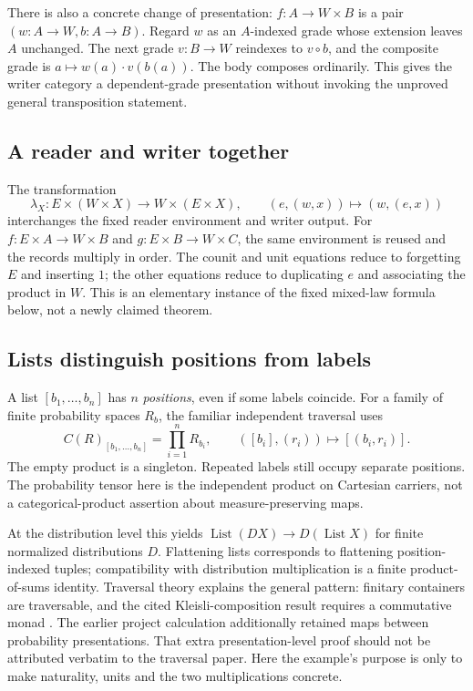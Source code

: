 \documentclass[11pt,letterpaper]{article}
\newcommand{\List}{\operatorname{List}}
\newcommand{\comp}{\mathbin{\circ}}
\begin{document}
There is also a concrete change of presentation: $f:A\to W\times B$ is a pair $(w:A\to W,b:A\to B)$. Regard $w$ as an $A$-indexed grade whose extension leaves $A$ unchanged. The next grade $v:B\to W$ reindexes to $v\comp b$, and the composite grade is $a\mapsto w(a)\cdot v(b(a))$. The body composes ordinarily. This gives the writer category a dependent-grade presentation without invoking the unproved general transposition statement.

\subsection{A reader and writer together}
The transformation
\[
\lambda_X:E\times(W\times X)\longrightarrow W\times(E\times X),
\qquad(e,(w,x))\longmapsto(w,(e,x))
\]
interchanges the fixed reader environment and writer output. For $f:E\times A\to W\times B$ and $g:E\times B\to W\times C$, the same environment is reused and the records multiply in order. The counit and unit equations reduce to forgetting $E$ and inserting $1$; the other equations reduce to duplicating $e$ and associating the product in $W$. This is an elementary instance of the fixed mixed-law formula below, not a newly claimed theorem.

\subsection{Lists distinguish positions from labels}
A list $[b_1,\ldots,b_n]$ has $n$ \emph{positions}, even if some labels coincide. For a family of finite probability spaces $R_b$, the familiar independent traversal uses
\[
C(R)_{[b_1,\ldots,b_n]}=\prod_{i=1}^{n}R_{b_i},
\qquad
([b_i],(r_i))\longmapsto[(b_i,r_i)].
\]
The empty product is a singleton. Repeated labels still occupy separate positions. The probability tensor here is the independent product on Cartesian carriers, not a categorical-product assertion about measure-preserving maps.

At the distribution level this yields $\List(DX)\to D(\List X)$ for finite normalized distributions $D$. Flattening lists corresponds to flattening position-indexed tuples; compatibility with distribution multiplication is a finite product-of-sums identity. Traversal theory explains the general pattern: finitary containers are traversable, and the cited Kleisli-composition result requires a commutative monad \cite[Theorem 3.7 and Lemma 4.1]{JR}. The earlier project calculation additionally retained maps between probability presentations. That extra presentation-level proof should not be attributed verbatim to the traversal paper. Here the example's purpose is only to make naturality, units and the two multiplications concrete.
\end{document}
